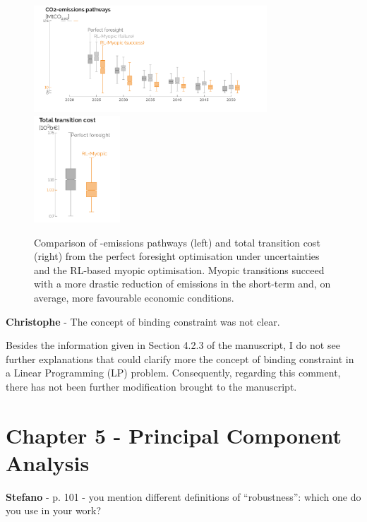 \documentclass[12pt,a4paper]{article}
\begin{document}
\begin{figure}[!htbp]
\centering
\includegraphics[height=4cm]{Gwp_pathway_core.pdf}
\includegraphics[height=4cm]{Transition_cost_comp_2.pdf}
\caption{Comparison of -emissions pathways (left) and total transition cost (right) from the perfect foresight optimisation under uncertainties and the RL-based myopic optimisation. Myopic transitions succeed with a more drastic reduction of emissions in the short-term and, on average, more favourable economic conditions.}
\label{fig:Gwp_pathway_total_tran_cost}
\end{figure}

\begin{mdframed}[style=comment] %
{\color{violet} \textbf{Christophe}} - The concept of binding constraint was not clear.
\end{mdframed}

\noindent
Besides the information given in Section 4.2.3 of the manuscript, I do not see further explanations that could clarify more the concept of binding constraint in a Linear Programming (LP) problem. Consequently, regarding this comment, there has not been further modification brought to the manuscript.

\section{Chapter 5 - Principal Component Analysis}
\label{PCA}

\begin{mdframed}[style=comment] %
{\color{orange} \textbf{Stefano}} - p. 101 - you mention different definitions of ``robustness'': which one do you use in your work?
\end{mdframed}
\end{document}
